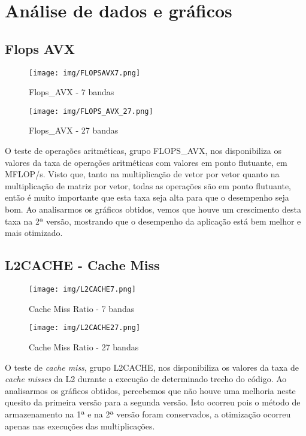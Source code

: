 \documentclass[12pt]{article}
\begin{document}
\section{Análise de dados e gráficos}\label{sec:analisedosdados}
\subsection{Flops AVX}\label{sec:analisedosdados}

\begin{figure}[H]
\centering
\texttt{[image: img/FLOPSAVX7.png]}
\caption{Flops\_AVX - 7 bandas}
\end{figure}

\begin{figure}[H]
\centering
\texttt{[image: img/FLOPS\_AVX\_27.png]}
\caption{Flops\_AVX - 27 bandas}
\end{figure}

O teste de operações aritméticas, grupo FLOPS\_AVX, nos disponibiliza os valores da taxa de operações aritméticas com valores em ponto flutuante, em MFLOP/s. Visto que, tanto na multiplicação de vetor por vetor quanto na multiplicação de matriz por vetor, todas as operações são em ponto flutuante, então é muito importante que esta taxa seja alta para que o desempenho seja bom. Ao analisarmos os gráficos obtidos, vemos que houve um crescimento desta taxa na 2ª versão, mostrando que o desempenho da aplicação está bem melhor e mais otimizado.

\subsection{L2CACHE - Cache Miss}\label{sec:analisedosdados}

\begin{figure}[H]
\centering
\texttt{[image: img/L2CACHE7.png]}
\caption{Cache Miss Ratio - 7 bandas}
\end{figure}

\begin{figure}[H]
\centering
\texttt{[image: img/L2CACHE27.png]}
\caption{Cache Miss Ratio - 27 bandas}
\end{figure}

O teste de \textit{cache miss}, grupo L2CACHE, nos disponibiliza os valores da taxa de \textit{cache misses} da L2 durante a execução de determinado trecho do código. Ao analisarmos os gráficos obtidos, percebemos que não houve uma melhoria neste quesito da primeira versão para a segunda versão. Isto ocorreu pois o método de armazenamento na 1ª e na 2ª versão foram conservados, a otimização ocorreu apenas nas execuções das multiplicações.
\end{document}
